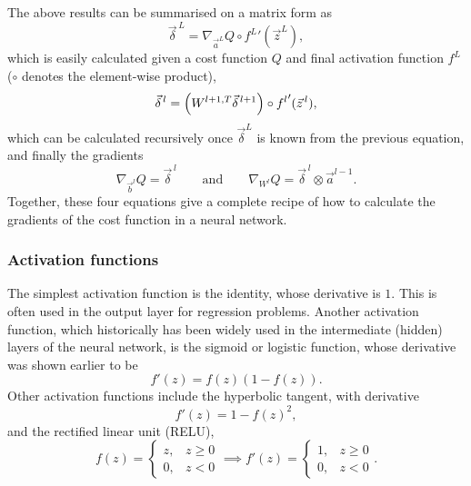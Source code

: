 \documentclass[11pt,british,a4paper]{article}
\numberwithin{equation}{section}
\begin{document}
The above results can be summarised on a matrix form as
\begin{equation}
    \vec{\delta}^{\,L} = \nabla_{\vec{a}^L}Q \circ {f^L}'(\vec{z}^L),
\end{equation}
which is easily calculated given a cost function \(Q\) and final activation function \(f^L\) (\(\circ\) denotes the element-wise product),
\begin{equation}
    \vec{\delta}^{\,l} = \qty(W^{l+1, T}\vec{\delta}^{\,l+1})\circ {f^l}'(\vec{z}^{\,l}),
\end{equation}
which can be calculated recursively once \(\vec{\delta}^L\) is known from the previous equation, and finally the gradients
\begin{equation}
    \nabla_{\vec{b}^l}Q = \vec{\delta}^{\,l} \qquad \text{and}\qquad \nabla_{W^l}Q = \vec{\delta}^{\,l} \otimes \vec{a}^{l-1}.
\end{equation}
Together, these four equations give a complete recipe of how to calculate the gradients of the cost function in a neural network.

\subsubsection{Activation functions}
The simplest activation function is the identity, whose derivative is \(1\). This is often used in the output layer for regression problems.
Another activation function, which historically has been widely used in the intermediate (hidden) layers of the neural network, is the sigmoid or logistic function, whose derivative was shown earlier to be
\begin{equation}
    f'(z) = f(z)(1-f(z)).
\end{equation}
Other activation functions include the hyperbolic tangent, with derivative
\begin{equation}
    f'(z) = 1 - f(z)^2,
\end{equation}
and the rectified linear unit (RELU),
\begin{equation}
    f(z) = \begin{cases}z, & z \geq 0 \\ 0, & z < 0 \end{cases}
    \implies
    f'(z) = \begin{cases}1, & z \geq 0 \\ 0, & z < 0 \end{cases} .
\end{equation}
\end{document}
